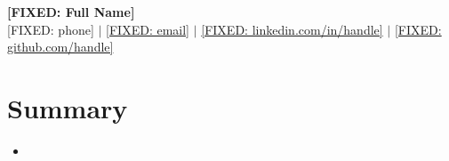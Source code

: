 \documentclass[letterpaper,10pt]{article}
\begin{document}
\begin{center}
{\Huge \textbf{[FIXED: Full Name]}} \\
\vspace{5pt}
\small
[FIXED: phone] $|$
\href{mailto:[FIXED: email]}{[FIXED: email]} $|$
\href{[FIXED: LinkedIn URL]}{[FIXED: linkedin.com/in/handle]} $|$
\href{[FIXED: GitHub URL]}{[FIXED: github.com/handle]}
\end{center}

\vspace{-20pt}
\section{Summary}
\begin{itemize}[leftmargin=*]
\item [GENERATE: Summary — copied from bundle_<lane>.md Summary block]
\end{itemize}

\vspace{-12pt}
\end{document}
